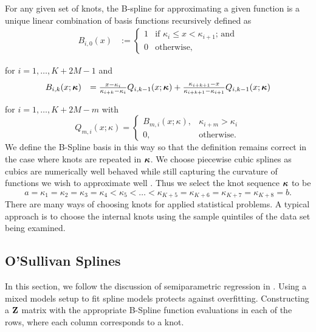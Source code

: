 For any given set of knots, the B-spline for approximating a given function is a unique linear combination of
basis functions recursively defined as
$$
\begin{array}{rl}
	B_{i, 0}(x) & := \begin{cases}                                                                                                        
	1           & \text{if } \kappa_i \leq x < \kappa_{i+1} \text{; and}                                                                                         \\
	0           & \text{otherwise,}                                                                                                        
	\end{cases}
\end{array}
$$

\noindent for $i = 1, \ldots, K + 2M -1$ and
$$
\begin{array}{rl}
	B_{i, k}(x; {\boldsymbol \kappa}) &= \frac{x - \kappa_i}{\kappa_{i + k} - \kappa_i} Q_{i, k-1} (x; {\boldsymbol \kappa}) + 
										\frac{\kappa_{i + k + 1} - x}{\kappa_{i + k + 1} - \kappa_{i + 1}} Q_{i, k-1} (x; {\boldsymbol \kappa})
\end{array}
$$

\noindent for $i = 1, \ldots, K + 2 M - m$ with
$$
Q_{m, i}(x; \kappa) =
\begin{cases}
B_{m, i}(x; \kappa),& \kappa_{i + m} > \kappa_i \\
0, & \text{otherwise}.
\end{cases}
$$
We define the B-Spline basis in this way so that the definition remains correct in the case where knots are
repeated in ${\boldsymbol \kappa}$. We choose piecewise cubic splines as cubics are numerically well behaved while still
capturing the curvature of functions we wish to approximate well \citep{Press:2007:NRE:1403886}. Thus we
select the knot sequence ${\boldsymbol \kappa}$ to be
$$
a = \kappa_1 = \kappa_2 = \kappa_3 = \kappa_4 < \kappa_5 < \ldots < \kappa_{K+5} = \kappa_{K+6} = \kappa_{K+7} = \kappa_{K+8} = b.
$$
There are many ways of choosing knots for applied statistical problems. A typical approach is to choose the
internal knots using the sample quintiles of the data set being examined.

\subsection{O'Sullivan Splines}
In this section, we follow the discussion of semiparametric regression in \cite{ruppert_wand_carroll_2003}.
Using a mixed models setup to fit spline models protects against overfitting. Constructing a ${\bf Z}$ matrix with
the appropriate B-Spline function evaluations in each of the rows, where each column corresponds to a knot.

